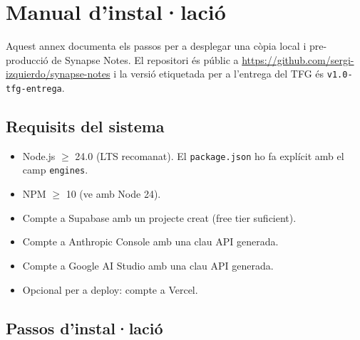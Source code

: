 \chapter{Manual d'instal·lació}
\label{ch:annex-install}

Aquest annex documenta els passos per a desplegar una còpia local i pre-producció de Synapse Notes. El repositori és públic a \url{https://github.com/sergi-izquierdo/synapse-notes} i la versió etiquetada per a l'entrega del TFG és \texttt{v1.0-tfg-entrega}.

\section*{Requisits del sistema}

\begin{itemize}
    \item Node.js $\geq$ 24.0 (LTS recomanat). El \texttt{package.json} ho fa explícit amb el camp \texttt{engines}.
    \item NPM $\geq$ 10 (ve amb Node 24).
    \item Compte a Supabase amb un projecte creat (free tier suficient).
    \item Compte a Anthropic Console amb una clau API generada.
    \item Compte a Google AI Studio amb una clau API generada.
    \item Opcional per a deploy: compte a Vercel.
\end{itemize}

\section*{Passos d'instal·lació}

